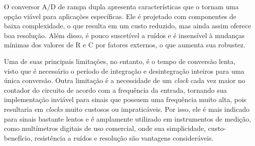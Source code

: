 O conversor A/D de rampa dupla apresenta características que o tornam uma opção viável para aplicações específicas. Ele é projetado com componentes de baixa complexidade, o que resulta em um custo reduzido, mas ainda assim oferece boa resolução. Além disso, é pouco suscetível a ruídos e é insensível à mudanças mínimas dos valores de R e C por fatores externos, o que aumenta sua robustez.

Uma de suas principais limitações, no entanto, é o tempo de conversão lenta, visto que é necessário o período de integração e desintegração inteiros para uma única conversão. Outra limitação é a necessidade de um \textit{clock} cada vez maior no contador do circuito de acordo com a frequência da entrada, tornando sua implementação inviável para sinais que possuem uma frequência muito alta, pois resultaria em \textit{clocks} muito custosos ou impraticáveis. Por isso, ele é mais indicado para sinais bastante lentos e é amplamente utilizado em instrumentos de medição, como multímetros digitais de uso comercial, onde sua simplicidade, custo-benefício, resistência a ruídos e resolução são vantagens consideráveis.

